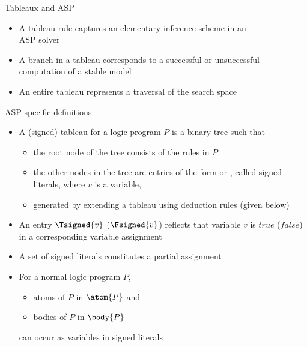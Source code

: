 \begin{frame}{Tableaux and ASP}
  \bigskip
  \begin{itemize}
  \item<1-> A tableau rule captures an elementary inference scheme in an\\ ASP solver
    \smallskip
  \item<2-> A \alert{branch} in a tableau corresponds to a successful or unsuccessful
    \alert{computation} of a stable model
    \smallskip
  \item<3-> An \alert{entire tableau} represents a traversal of the \alert{search space}
  \end{itemize}
\end{frame}
\begin{frame}{ASP-specific definitions}
  \begin{itemize}
  \item<1-> A (signed) \alert{tableau} for a logic program $P$ is a binary tree such that
    \begin{itemize}\normalsize
    \item the root node of the tree consists of the rules in $P$
    \item the other nodes in the tree are \alert{entries} of the form 
      or , called \alert{signed literals}, where $v$ is a variable,
    \item generated by extending a tableau using deduction rules (given below)
    \end{itemize}
    \smallskip
  \item<2-> An entry $\Tsigned{v}$ ($\Fsigned{v}$) reflects that variable $v$ is
    $\mathit{true}$ ($\mathit{false}$) in a corresponding variable assignment
  \item<2->[] A set of signed literals constitutes a partial assignment
    \smallskip
  \item<3-> For a normal logic program $P$,
    \begin{itemize}\normalsize
    \item atoms  of $P$ in $\atom{P}$ and
    \item bodies of $P$ in $\body{P}$
    \end{itemize}
    can occur as variables in signed literals
  \end{itemize}
\end{frame}
